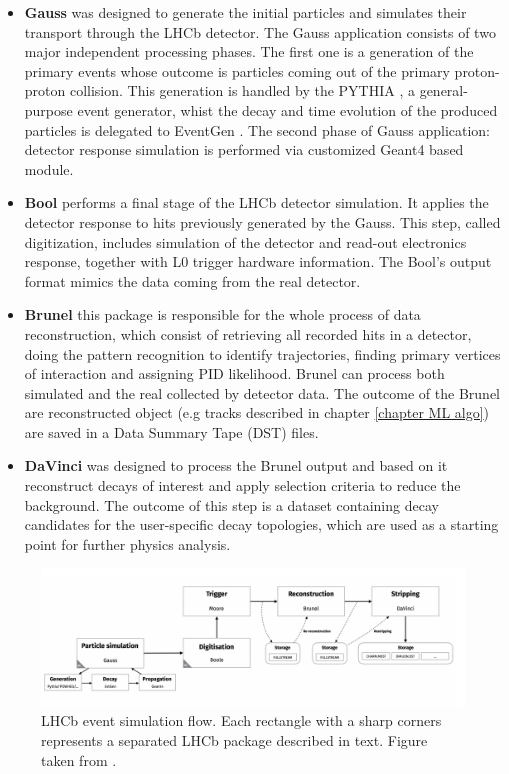 \begin{itemize}
    \item \textbf{Gauss} \cite{gauss_lhcb} was designed to generate the initial particles and simulates their transport through the LHCb detector. The Gauss application consists of two major independent processing phases. The first one is a generation of the primary events whose outcome is particles coming out of the primary proton-proton collision. This generation is handled by the PYTHIA \cite{pythia}, a general-purpose event generator, whist the decay and time evolution of the produced particles is delegated to EventGen \cite{EventGen}. The second phase of Gauss application: detector response simulation is performed via customized Geant4 \cite{geant4} based module. 
    \item \textbf{Bool} \cite{lhcb_software}  performs a final stage of the LHCb detector simulation. It applies the detector response to hits previously generated by the Gauss. This step, called digitization, includes simulation of the detector and read-out electronics response, together with  L0 trigger hardware information. The Bool's output format mimics the data coming from the real detector.
    \item \textbf{Brunel} \cite{lhcb_software} this package is responsible for the whole process of data reconstruction, which consist of retrieving all recorded hits in a detector, doing the pattern recognition to identify trajectories, finding primary vertices of interaction and assigning PID likelihood. Brunel can process both simulated and the real collected by detector data. The outcome of the Brunel are reconstructed object (e.g tracks described in chapter \ref{chapter ML algo}) are saved in a Data Summary Tape (DST) files.   
    \item  \textbf{DaVinci} \cite{lhcb_software} was designed to process the Brunel output and based on it reconstruct decays of interest and apply selection criteria to reduce the background. The outcome of this step is a dataset containing decay candidates for the user-specific decay topologies, which are used as a starting point for further physics analysis.   
    
\end{itemize}


\begin{figure}[!h]
\centering
\includegraphics[width=\linewidth]{figures/LHCb_simulation.PNG}
\caption{LHCb event simulation flow. Each rectangle with a sharp corners represents a separated LHCb package described in text. Figure taken from  \cite{lhcb_computing}.
\label{fig:lhcb_sim}}
\end{figure}



